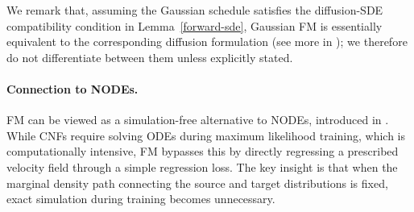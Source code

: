 \begin{table}[th]
\caption{Comparison between diffusion models (or Gaussian FM) and the general FM framework.  
Here, the general FM framework refers to the setting with two-sided conditioning, 
where $\mathbf{x}_0 \sim p_{\text{src}}$ and $\mathbf{x}_1 \sim p_{\text{tgt}}$ 
are sampled independently.}
\label{tab:framework_comparison}
\centering
{}
\end{table}
We remark that, assuming the Gaussian schedule satisfies the diffusion-SDE
compatibility condition in Lemma~\ref{forward-sde}, Gaussian FM is essentially
equivalent to the corresponding diffusion formulation (see more in
); we therefore do not differentiate between them
unless explicitly stated.


\paragraph{Connection to NODEs.}
FM can be viewed as a simulation-free alternative to NODEs, introduced in . While CNFs require solving ODEs during maximum likelihood training, which is computationally intensive, FM bypasses this by directly regressing a prescribed velocity field through a simple regression loss. The key insight is that when the marginal density path connecting the source and target distributions is fixed, exact simulation during training becomes unnecessary.


